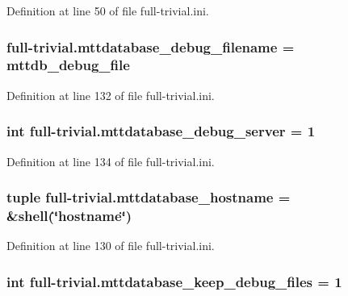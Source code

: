Definition at line 50 of file full-\/trivial.\-ini.

\hypertarget{namespacefull-trivial_a5a952dcadcccb56251a2745399a467c5}{
\subsubsection[{mttdatabase\-\_\-debug\-\_\-filename}]{\setlength{\rightskip}{0pt plus 5cm}full-\/trivial.\-mttdatabase\-\_\-debug\-\_\-filename = mttdb\-\_\-debug\-\_\-file}}\label{namespacefull-trivial_a5a952dcadcccb56251a2745399a467c5}


Definition at line 132 of file full-\/trivial.\-ini.

\hypertarget{namespacefull-trivial_a6ed803b39509a0e919f4f11063cb5209}{
\subsubsection[{mttdatabase\-\_\-debug\-\_\-server}]{\setlength{\rightskip}{0pt plus 5cm}int full-\/trivial.\-mttdatabase\-\_\-debug\-\_\-server = 1}}\label{namespacefull-trivial_a6ed803b39509a0e919f4f11063cb5209}


Definition at line 134 of file full-\/trivial.\-ini.

\hypertarget{namespacefull-trivial_a774cf7cf721e8c1716122a628a72e4f8}{
\subsubsection[{mttdatabase\-\_\-hostname}]{\setlength{\rightskip}{0pt plus 5cm}tuple full-\/trivial.\-mttdatabase\-\_\-hostname = \&shell(\char`\"{}hostname\char`\"{})}}\label{namespacefull-trivial_a774cf7cf721e8c1716122a628a72e4f8}


Definition at line 130 of file full-\/trivial.\-ini.

\hypertarget{namespacefull-trivial_ad2a2564c1ae95fb67eda20314bac44f5}{
\subsubsection[{mttdatabase\-\_\-keep\-\_\-debug\-\_\-files}]{\setlength{\rightskip}{0pt plus 5cm}int full-\/trivial.\-mttdatabase\-\_\-keep\-\_\-debug\-\_\-files = 1}}\label{namespacefull-trivial_ad2a2564c1ae95fb67eda20314bac44f5}


